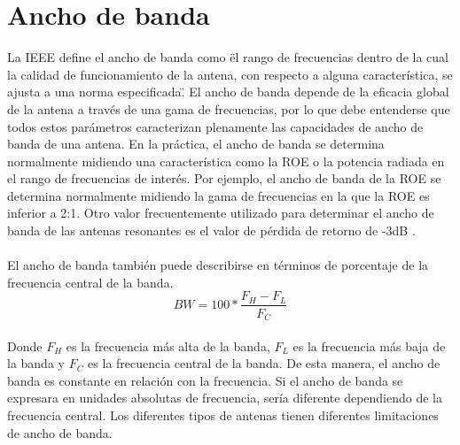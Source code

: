 \documentclass[12pt,letterpaper]{article}
\begin{document}



\newpage
\section{Ancho de banda}
La IEEE define el ancho de banda como \"el rango de frecuencias dentro de la cual la 
calidad de funcionamiento de la antena, con respecto a alguna característica, se ajusta 
a una norma especificada\".  El ancho de banda depende de la eficacia global de la antena 
a través de una gama de frecuencias, por lo que debe entenderse que todos estos parámetros 
caracterizan plenamente las capacidades de ancho de banda de una antena. En la práctica, 
el ancho de banda se determina normalmente midiendo una característica como la ROE o la 
potencia radiada en el rango de frecuencias de interés. Por ejemplo, el ancho de banda de 
la ROE se determina normalmente midiendo la gama de frecuencias en la que la ROE es 
inferior a 2:1. Otro valor frecuentemente utilizado para determinar el ancho de banda de 
las antenas resonantes es el valor de pérdida de retorno de -3dB \cite{anchobanda}. 
\\ \\
El ancho de banda también puede describirse en términos de porcentaje de la frecuencia 
central de la banda.
\begin{equation}
    BW=100 * \frac{F_H-F_L}{F_C}
\end{equation}
\\
Donde $F_H$ es la frecuencia más alta de la banda, $F_L$ es la frecuencia más baja de 
la banda y $F_C$ es la frecuencia central de la banda. De esta manera, el ancho de banda 
es constante en relación con la frecuencia. Si el ancho de banda se expresara en unidades 
absolutas de frecuencia, sería diferente dependiendo de la frecuencia central. Los 
diferentes tipos de antenas tienen diferentes limitaciones de ancho de banda. 
\end{document}
